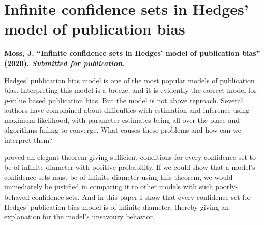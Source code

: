 \section{Infinite confidence sets in Hedges' model of publication
bias}
\textbf{Moss, J. ``Infinite confidence sets in Hedges' model of publication
bias'' (2020). \emph{Submitted for publication.}}

Hedges' publication bias model is one of the most popular models of publication bias. Interpreting this model is a breeze, and it is evidently the correct model for \textit{p}-value based publication bias. But the model is not above reproach. Several authors have complained about difficulties with estimation and inference using maximum likelihood, with parameter estimates being all over the place and algorithms failing to converge. What causes these problems and how can we interpret them?

\textcite{Gleser1987-ii} proved an elegant theorem giving sufficient conditions for every confidence set to be of infinite diameter with positive probability. If we could show that a model's confidence sets must be of infinite diameter using this theorem, we would immediately be justified in comparing it to other models with such poorly-behaved confidence sets. And in this paper I show that every confidence set for Hedges' publication bias model is of infinite diameter, thereby giving an explanation for the model's unsavoury behavior.